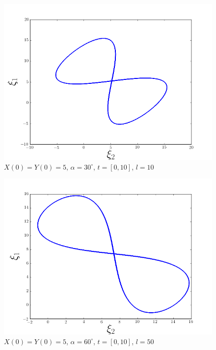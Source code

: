 \documentclass[a4paper,10pt]{article}
\numberwithin{equation}{section}
\begin{document}
\begin{figure}[H]
 \center 
 \includegraphics[scale=0.5]{problema1fig7}
 \caption{$X(0) = Y(0) = 5$, $\alpha = 30^\circ$, $t = [0,10]$, $l = 10$}
 \label{problema1fig7}
\end{figure}

\begin{figure}[H]
 \center 
 \includegraphics[scale=0.5]{problema1fig8}
 \caption{$X(0) = Y(0) = 5$, $\alpha = 60^\circ$, $t = [0,10]$, $l = 50$}
 \label{problema1fig8}
\end{figure}
\end{document}
